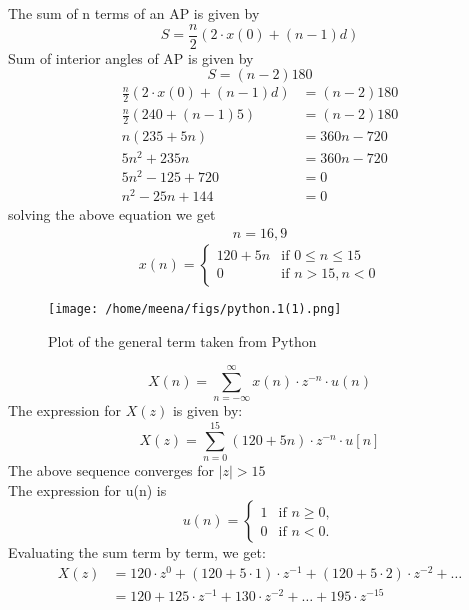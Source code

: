\documentclass[journal,12pt,twocolumn]{IEEEtran}
\theoremstyle{remark}
\begin{document}
The sum of n terms of an AP is given by
\begin{equation}
    S=\frac{n}{2}(2\cdot x(0)+(n-1)d)
\end{equation}
Sum of interior angles of AP is given by
\begin{equation}
    S=(n-2)180
\end{equation}
\begin{align}
\frac{n}{2}(2\cdot x(0)+(n-1)d)&= (n-2)180\\
    \frac{n}{2}(240+(n-1)5)&=(n-2)180\\
    n(235+5n)&=360n-720\\
    5n^2+235n&=360n-720\\
    5n^2-125+720&=0\\
    n^2-25n+144&=0
\end{align}
solving the above equation we get
\begin{align}
   n=16,9
\end{align}
\[ x(n) = \begin{cases}
          120 + 5n & \text{if }0 \leq n\leq 15 \\
          0 & \text{if } n >15 , n<0
       \end{cases} \]
\begin{figure}[h]
  \centering
  \texttt{[image: /home/meena/figs/python.1(1).png]} 
  \captionsetup{justification=centering}
  \caption{Plot of the general term taken from Python}
  \label{fig:your_label}
\end{figure}
\begin{equation}
    X(n) = \sum_{n=-\infty}^{\infty} x(n) \cdot z^{-n}\cdot u(n)
\end{equation}
The expression for \(X(z)\) is given by:
\begin{equation}
    X(z) = \sum_{n=0}^{15} (120 + 5n) \cdot z^{-n} \cdot u[n]
\end{equation}
The above sequence  converges for \(\lvert z \rvert > 15\)\\
The expression for u(n) is 
\[ u(n) = \begin{cases}
    1 & \text{if } n \geq 0, \\
    0 & \text{if } n < 0.
\end{cases} \]
Evaluating the sum term by term, we get:
\begin{align}
X(z) &= 120 \cdot z^0 + (120 + 5 \cdot 1) \cdot z^{-1} + (120 + 5 \cdot 2) \cdot z^{-2} + \ldots  \\
&= 120 + 125 \cdot z^{-1} + 130 \cdot z^{-2} + \ldots + 195 \cdot z^{-15}
\end{align}
\end{document}
